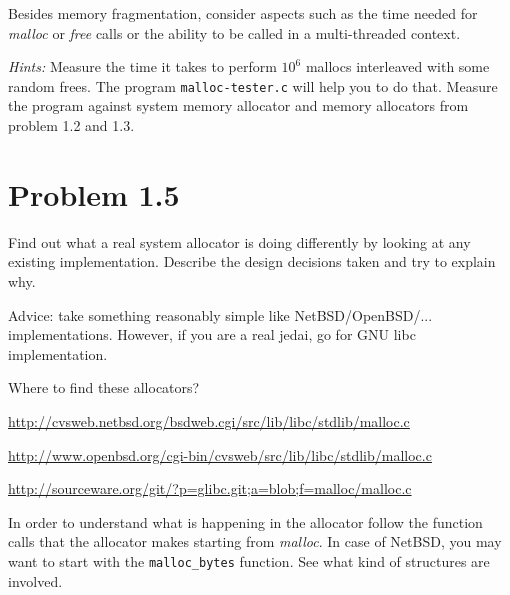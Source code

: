 \documentclass[a4paper,10pt]{scrartcl}
\begin{document}
    Besides memory fragmentation, consider aspects such as the time needed for
    \textit{malloc} or \textit{free} calls or the ability to be called in 
    a multi-threaded context.

    \textsl{Hints:}
    Measure the time it takes to perform $10^6$ mallocs interleaved with
    some random frees.  The program \verb|malloc-tester.c| will help you 
    to do that.  Measure the program against system memory
    allocator and memory allocators from problem 1.2 and 1.3.
    
    \section{Problem 1.5}

    Find out what a real system 
    allocator is doing differently by looking at any existing
    implementation. Describe the design decisions taken and try to
    explain why.

    Advice: take something reasonably simple like NetBSD/OpenBSD/...
    implementations.  However, if you are a real jedai, go for GNU
    libc implementation.

    Where to find these allocators?
    \begin{description}
        {\small
        \item[NetBSD]    
        \url{http://cvsweb.netbsd.org/bsdweb.cgi/src/lib/libc/stdlib/malloc.c}

        \item[OpenBSD]
        
        \url{http://www.openbsd.org/cgi-bin/cvsweb/src/lib/libc/stdlib/malloc.c}

        \item[Glibc (**)]
        
        \url{http://sourceware.org/git/?p=glibc.git;a=blob;f=malloc/malloc.c}
        }
    \end{description}

    In order to understand what is happening in the allocator follow the
    function calls that the allocator makes starting from
    \textit{malloc}.  In case of NetBSD, you may want to start with the
    \verb|malloc_bytes| function.  See what kind of structures are
    involved.
\end{document}
